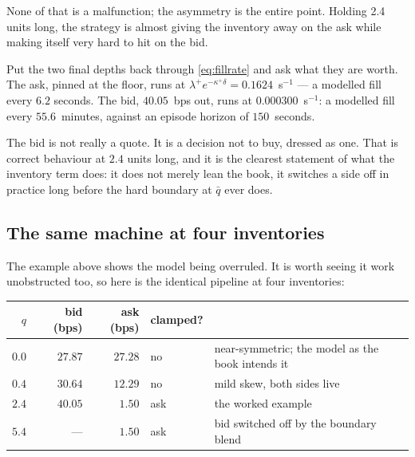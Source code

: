 \documentclass[11pt,a4paper]{article}
\begin{document}
None of that is a malfunction; the asymmetry is the entire point. Holding 2.4
units long, the strategy is almost giving the inventory away on the ask while
making itself very hard to hit on the bid.

\begin{intuition}
Put the two final depths back through \eqref{eq:fillrate} and ask what they are
worth. The ask, pinned at the floor, runs at
$\lambda^{+}e^{-\kappa^{+}\delta} = 0.1624$~s$^{-1}$ --- a modelled fill every
$6.2$ seconds. The bid, $40.05$~bps out, runs at $0.000300$~s$^{-1}$: a modelled
fill every $55.6$~minutes, against an episode horizon of $150$~seconds.

The bid is not really a quote. It is a decision not to buy, dressed as one. That
is correct behaviour at $2.4$ units long, and it is the clearest statement of
what the inventory term does: it does not merely lean the book, it switches a
side off in practice long before the hard boundary at $\bar q$ ever does.
\end{intuition}

\subsection{The same machine at four inventories}

The example above shows the model being overruled. It is worth seeing it work
unobstructed too, so here is the identical pipeline at four inventories:

\begin{center}\small
\begin{tabular}{@{}rrrll@{}}
\toprule
$q$ & bid (bps) & ask (bps) & clamped? & \\
\midrule
$0.0$ & $27.87$ & $27.28$ & no & near-symmetric; the model as the book intends it \\
$0.4$ & $30.64$ & $12.29$ & no & mild skew, both sides live \\
$2.4$ & $40.05$ & $1.50$ & ask & the worked example \\
$5.4$ & --- & $1.50$ & ask & bid switched off by the boundary blend \\
\bottomrule
\end{tabular}
\end{center}
\end{document}
